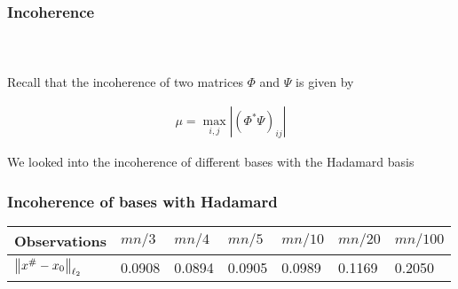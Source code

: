 
\begin{frame}[t]
\frametitle{Incoherence}
\framesubtitle{~~}  %

Recall that the incoherence of two matrices $\Phi$ and $\Psi$ is given by 

\begin{align}
	\mu = \max_{i,j} |(\Phi^* \Psi)_{ij}|
	\label{incoherence}
\end{align}

We looked into the incoherence of different bases with the Hadamard basis

\end{frame}


\begin{frame}[t]
	\frametitle{Incoherence of bases with Hadamard}


\begin{table}[h]
\begin{tabular}{l|l|l|l|l|l|l}
Observations                 & $mn/3$ & $mn/4$ & $mn/5$ & $mn/10$ & $mn/20$ & $mn/100$ \\ \hline
$\left\lVert x^\# - x_0 \right\rVert_{\ell_2}$ & 0.0908 & 0.0894 & 0.0905 & 0.0989  & 0.1169  & 0.2050   \\
\end{tabular}
\end{table}

\end{frame}




